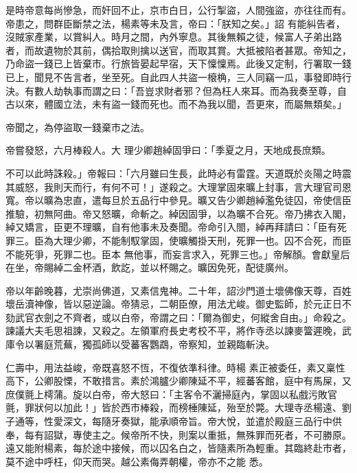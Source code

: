 \begin{pinyinscope}
 是時帝意每尚慘急，而奸回不止，京市白日，公行掣盜，人間強盜，亦往往而有。帝患之，問群臣斷禁之法，楊素等未及言，帝曰：「朕知之矣。」詔
 有能糾告者，沒賊家產業，以賞糾人。時月之間，內外寧息。其後無賴之徒，候富人子弟出路者，而故遺物於其前，偶拾取則擒以送官，而取其賞。大抵被陷者甚眾。帝知之，乃命盜一錢已上皆棄市。行旅皆晏起早宿，天下懍懍焉。此後又定制，行署取一錢已上，聞見不告言者，坐至死。自此四人共盜一榱桷，三人同竊一瓜，事發即時行決。有數人劫執事而謂之曰：「吾豈求財者邪？但為枉人來耳。而為我奏至尊，自古以來，體國立法，未有盜一錢而死也。而不為我以聞，吾更來，而屬無類矣。」



 帝聞之，為停盜取一錢棄市之法。



 帝嘗發怒，六月棒殺人。大
 理少卿趙綽固爭曰：「季夏之月，天地成長庶類。



 不可以此時誅殺。」帝報曰：「六月雖曰生長，此時必有雷霆。天道既於炎陽之時震其威怒，我則天而行，有何不可！」遂殺之。大理掌固來曠上封事，言大理官司恩寬。帝以曠為忠直，遣每旦於五品行中參見。曠又告少卿趙綽濫免徒囚，帝使信臣推驗，初無阿曲。帝又怒曠，命斬之。綽因固爭，以為曠不合死。帝乃拂衣入閣，綽又矯言，臣更不理曠，自有他事未及奏聞。帝命引入閤，綽再拜請曰：「臣有死罪三。臣為大理少卿，不能制馭掌固，使曠觸掛天刑，死罪一也。囚不合死，而臣不能死爭，死罪二也。臣本
 無他事，而妄言求入，死罪三也。」帝解顏。會獻皇后在坐，帝賜綽二金杯酒，飲訖，並以杯賜之。曠因免死，配徒廣州。



 帝以年齡晚暮，尤崇尚佛道，又素信鬼神。二十年，詔沙門道士壞佛像天尊，百姓壞岳瀆神像，皆以惡逆論。帝猜忌，二朝臣僚，用法尤峻。御史監師，於元正日不劾武官衣劍之不齊者，或以白帝，帝謂之曰：「爾為御史，何縱舍自由。」命殺之。諫議大夫毛思祖諫，又殺之。左領軍府長史考校不平，將作寺丞以諫麥簹遲晚，武庫令以署庭荒蕪，獨孤師以受蕃客鸚鵡，帝察知，並親臨斬決。



 仁壽中，用法益峻，帝既喜怒不恆，不復依準科律。時楊
 素正被委任，素又稟性高下，公卿股慄，不敢措言。素於鴻臚少卿陳延不平，經蕃客館，庭中有馬屎，又庶僕氈上樗蒲。旋以白帝，帝大怒曰：「主客令不灑掃庭內，掌固以私戲污敗官氈，罪狀何以加此！」皆於西市棒殺，而榜棰陳延，殆至於斃。大理寺丞楊遠、劉子通等，性愛深文，每隨牙奏獄，能承順帝旨。帝大悅，並遣於殿庭三品行中供奉，每有詔獄，專使主之。候帝所不快，則案以重抵，無殊罪而死者，不可勝原。遠又能附楊素，每於途中接候，而以囚名白之，皆隨素所為輕重。其臨終赴市者，莫不途中呼枉，仰天而哭。越公素侮弄朝權，帝亦不之能
 悉。




\end{pinyinscope}
